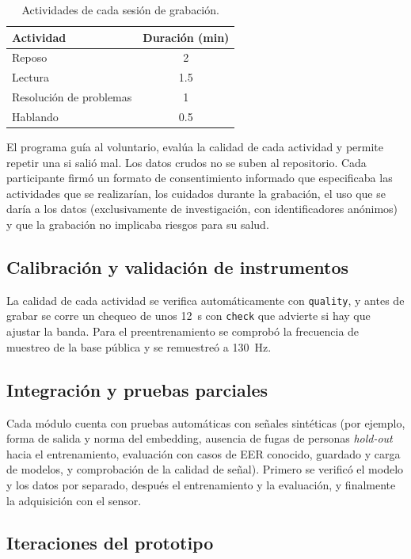 \begin{table}[htbp]
\centering
\caption{Actividades de cada sesión de grabación.}
\label{tab:sesion}
\small
\begin{tabular}{l c}
\toprule
\textbf{Actividad} & \textbf{Duración (min)} \\
\midrule
Reposo & 2 \\
Lectura & 1.5 \\
Resolución de problemas & 1 \\
Hablando & 0.5 \\
\bottomrule
\end{tabular}
\end{table}

El programa guía al voluntario, evalúa la calidad de cada actividad y permite repetir una si salió mal. Los datos crudos no se suben al repositorio. Cada participante firmó un formato de consentimiento informado que especificaba las actividades que se realizarían, los cuidados durante la grabación, el uso que se daría a los datos (exclusivamente de investigación, con identificadores anónimos) y que la grabación no implicaba riesgos para su salud. 

\subsection{Calibración y validación de instrumentos}

La calidad de cada actividad se verifica automáticamente con \texttt{quality}, y antes de grabar se corre un chequeo de unos 12~s con \texttt{check} que advierte si hay que ajustar la banda. Para el preentrenamiento se comprobó la frecuencia de muestreo de la base pública y se remuestreó a 130~Hz.

\subsection{Integración y pruebas parciales}

Cada módulo cuenta con pruebas automáticas con señales sintéticas (por ejemplo, forma de salida y norma del embedding, ausencia de fugas de personas \emph{hold-out} hacia el entrenamiento, evaluación con casos de EER conocido, guardado y carga de modelos, y comprobación de la calidad de señal). Primero se verificó el modelo y los datos por separado, después el entrenamiento y la evaluación, y finalmente la adquisición con el sensor.

\subsection{Iteraciones del prototipo}

